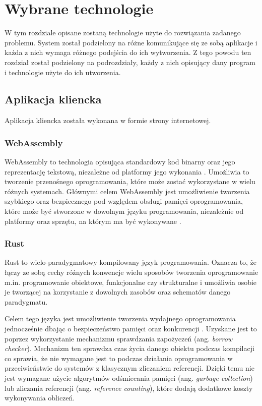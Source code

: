 \chapter{Wybrane technologie}

W tym rozdziale opisane zostaną technologie użyte do rozwiązania zadanego problemu.
System został podzielony na różne komunikujące się ze sobą aplikacje i każda z nich
wymaga różnego podejścia do ich wytworzenia. Z tego powodu ten rozdział został podzielony
na podrozdziały, każdy z nich opisujący dany program i technologie użyte do ich
utworzenia.

\section{Aplikacja kliencka}
Aplikacja kliencka została wykonana w formie strony internetowej.

\subsection*{WebAssembly}
WebAssembly to technologia opisująca standardowy kod binarny oraz jego reprezentację tekstową,
niezależne od platformy jego wykonania \cite{mdn:wasm, wasm:standard}. Umożliwia to
tworzenie przenośnego oprogramowania, które może zostać wykorzystane w wielu różnych systemach.
Głównymi celem WebAssembly jest umożliwienie tworzenia szybkiego oraz bezpiecznego pod względem
obsługi pamięci oprogramowania, które może być stworzone w dowolnym języku programowania, 
niezależnie od platformy oraz sprzętu, na którym ma być wykonywane \cite{wasm:standard}.

\subsection*{Rust}
Rust to wielo-paradygmatowy kompilowany język programowania. Oznacza to, że łączy ze sobą cechy różnych
konwencje wielu sposobów tworzenia oprogramowanie m.in. programowanie obiektowe, funkcjonalne
czy strukturalne i umożliwia osobie je tworzącej na korzystanie z dowolnych zasobów oraz
schematów danego paradygmatu. 

Celem tego języka jest umożliwienie tworzenia wydajnego oprogramowania jednocześnie
dbając o bezpieczeństwo pamięci oraz konkurencji \cite{infoworld:what_is_rust}. 
Uzyskane jest to poprzez wykorzystanie mechanizmu sprawdzania zapożyczeń (ang. \textit{borrow checker}).
Mechanizm ten sprawdza czas życia danego obiektu podczas kompilacji co sprawia, że nie wymagane
jest to podczas działania oprogramowania w przeciwieństwie do systemów z klasycznym zliczaniem referencji.
Dzięki temu nie jest wymagane użycie algorytmów odśmiecania pamięci
(ang. \textit{garbage collection}) lub zliczania referencji (ang. \textit{reference counting}), 
które dodają dodatkowe koszty wykonywania obliczeń.

